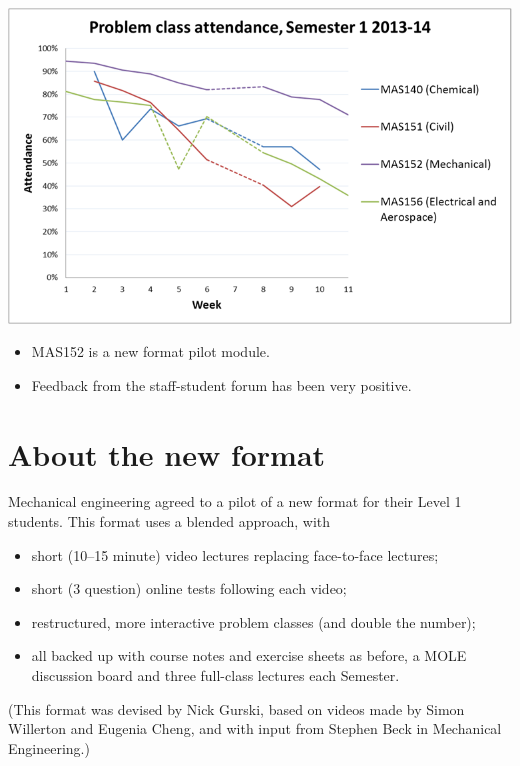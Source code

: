 \documentclass[12pt,envcountsect]{beamer}
\theoremstyle{plain}
\theoremstyle{definition}
\begin{document}
\begin{frame}
\includegraphics[width=1\textwidth]{attendance_chart_2.png}

{\scriptsize
\begin{itemize}
\item MAS152 is a new format pilot module.\pause
\item Feedback from the staff-student forum has been very positive.
\end{itemize}
}
\end{frame}

\section{About the new format}

\begin{frame}
Mechanical engineering agreed to a pilot of a new format for their Level 1 students. \pause This format uses a blended approach, with \pause
\begin{itemize}
\item short (10--15 minute) video lectures replacing face-to-face lectures;\pause
\item short (3 question) online tests following each video;\pause
\item restructured, more interactive problem classes \pause (and double the number);\pause
\item all backed up with course notes and exercise sheets as before, \pause a MOLE discussion board \pause and three full-class lectures each Semester.\pause
\end{itemize}
(This format was devised by Nick Gurski, based on videos made by Simon Willerton and Eugenia Cheng, and with input from Stephen Beck in Mechanical Engineering.)
\end{frame}
\end{document}
